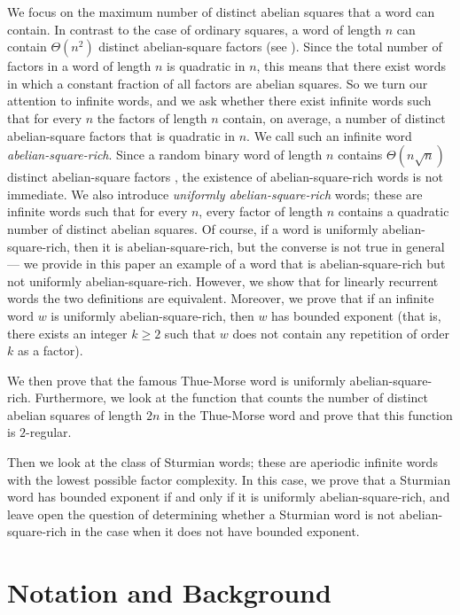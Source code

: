 \documentclass[11pt,reqno]{amsart}
\numberwithin{equation}{section}
\theoremstyle{plain}
\theoremstyle{definition}
\theoremstyle{remark}
\begin{document}
We focus on the maximum number of distinct abelian squares that a word can contain.
In contrast to the case of ordinary squares, a word of length $n$ can contain $\Theta(n^2)$ distinct abelian-square factors (see \cite{Ry14}). Since the total number of factors in a word of length $n$ is quadratic in $n$, this means that there exist words in which a constant fraction of all factors are abelian squares. So we turn our attention to infinite words, and we ask whether there exist infinite words such that for every $n$ the factors of length $n$ contain, on average,
a number of distinct abelian-square factors that is quadratic in $n$.   We call such an infinite word \emph{abelian-square-rich}. Since a random binary word of length $n$ contains $\Theta(n\sqrt{n})$  distinct abelian-square factors \cite{Ch14}, the existence of abelian-square-rich words is not immediate. We also introduce \emph{uniformly abelian-square-rich} words; these are infinite words such that for every $n$, every factor of length $n$ contains a quadratic number of distinct abelian squares. Of course, if a word is uniformly abelian-square-rich, then it is abelian-square-rich, but the converse is not true in general --- we provide in this paper an example of a  word that is abelian-square-rich but not uniformly abelian-square-rich. However, we show that for linearly recurrent words the two definitions are equivalent. Moreover, we prove that if an infinite word $w$ is uniformly abelian-square-rich, then $w$ has bounded exponent (that is, there exists an integer $k\geq 2$ such that $w$ does not contain any repetition of order $k$ as a factor).

We then prove that the famous Thue-Morse word is uniformly abelian-square-rich. Furthermore, we look at the function that counts the number of distinct abelian squares of length $2n$ in the Thue-Morse word and prove that this function is $2$-regular.

Then we look at the class of Sturmian words; these are aperiodic infinite words with the lowest possible factor complexity. In this case, we prove that a Sturmian word has bounded exponent if and only if it is uniformly abelian-square-rich, and leave open the question of determining whether a Sturmian word is not abelian-square-rich in the case when it does not have bounded exponent.

\section{Notation and Background}
\end{document}
